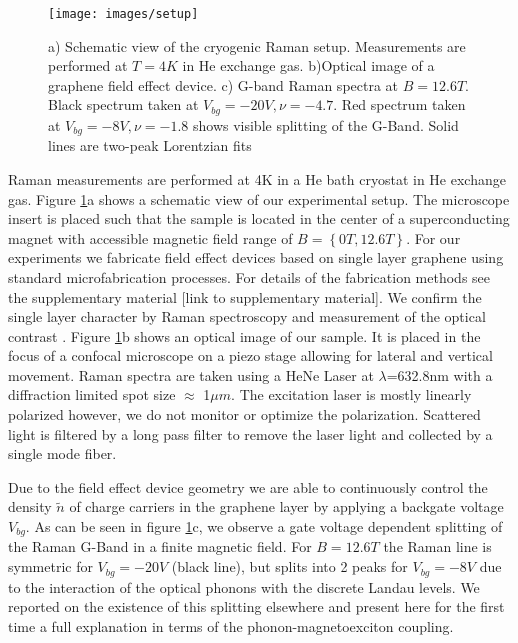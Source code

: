 \documentclass[prl,aps,superscriptaddress,reprint]{revtex4-1}
\begin{document}
\begin{figure}
    \texttt{[image: images/setup]}
    \caption{\label{setup}a) Schematic view of the cryogenic Raman setup. Measurements are performed at $T=4K$ in He exchange gas. b)Optical image of a graphene field effect device. c) G-band Raman spectra at $B=12.6T$. Black spectrum taken at $V_{bg}=-20V, \nu=-4.7$. Red spectrum taken at $V_{bg}=-8V,\nu=-1.8$ shows visible splitting of the G-Band. Solid lines are two-peak Lorentzian fits}
\end{figure}

Raman measurements are performed at 4K in a He bath cryostat in He exchange gas. Figure \ref{setup}a shows a schematic view of our experimental setup. The microscope insert is placed such that the sample is located in the center of a superconducting magnet with accessible magnetic field range of $B=\left\lbrace 0T,12.6T \right\rbrace$.
For our experiments we fabricate field effect devices based on single layer graphene using standard microfabrication processes. For details of the fabrication methods see the supplementary material [link to supplementary material]. We confirm the single layer character by Raman spectroscopy and measurement of the optical contrast \cite{ferrari2006raman,casiraghi2007rayleigh,ni2007graphene,blake2007making}. Figure \ref{setup}b shows an optical image of our sample. It is placed in the focus of a confocal microscope on a piezo stage allowing for lateral and vertical movement. Raman spectra are taken using a HeNe Laser at $\lambda$=632.8nm with a diffraction limited spot size $\approx$ 1$\mu m$. The excitation laser is mostly linearly polarized however, we do not monitor or optimize the polarization. Scattered light is filtered by a long pass filter to remove the laser light and collected by a single mode fiber.

Due to the field effect device geometry we are able to continuously control the density $\widetilde{n}$ of charge carriers in the graphene layer by applying a backgate voltage $V_{bg}$. As can be seen in figure \ref{setup}c, we observe a gate voltage dependent splitting of the Raman G-Band in a finite magnetic field. For $B=12.6T$ the Raman line is symmetric for $V_{bg}=-20V$ (black line), but splits into 2 peaks for $V_{bg}=-8V$ due to the interaction of the optical phonons with the discrete Landau levels. We reported on the existence of this splitting elsewhere \cite{kias2009} and present here for the first time a full explanation in terms of the phonon-magnetoexciton coupling.
\end{document}
